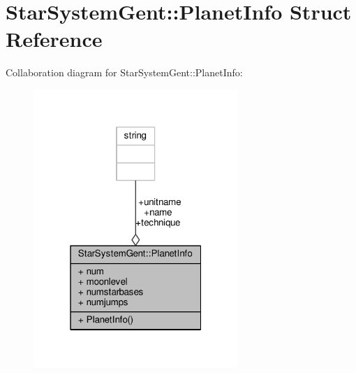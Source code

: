 \hypertarget{structStarSystemGent_1_1PlanetInfo}{}\section{Star\+System\+Gent\+:\+:Planet\+Info Struct Reference}
\label{structStarSystemGent_1_1PlanetInfo}


Collaboration diagram for Star\+System\+Gent\+:\+:Planet\+Info\+:
\nopagebreak
\begin{figure}[H]
\begin{center}
\leavevmode
\includegraphics[width=220pt]{da/dec/structStarSystemGent_1_1PlanetInfo__coll__graph}
\end{center}
\end{figure}
